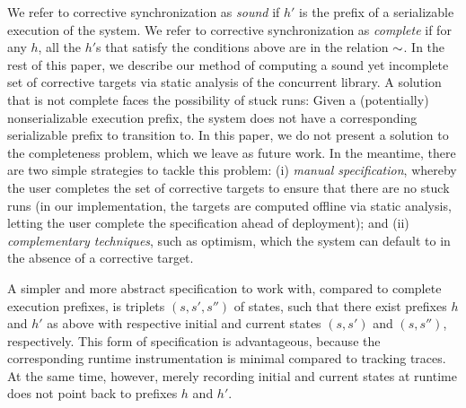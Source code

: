 We refer to corrective synchronization as \emph{sound} if $h'$ is the prefix of a serializable execution of the system. We refer to corrective synchronization as \emph{complete} if for any $h$, all the $h'$s that satisfy the conditions above are in the relation $\sim$. In the rest of this paper, we describe our method of computing a sound yet incomplete set of corrective targets via static analysis of the concurrent library.
%
A solution that is not complete faces the possibility of stuck runs: Given a (potentially) nonserializable execution prefix, the system does not have a corresponding serializable prefix to transition to. In this paper, we do not present a solution to the completeness problem, which we leave as future work. In the meantime, there are two simple strategies to tackle this problem: (i) \emph{manual specification}, whereby the user completes the set of corrective targets to ensure that there are no stuck runs (in our implementation, the targets are computed offline via static analysis, letting the user complete the specification ahead of deployment); and (ii) \emph{complementary techniques}, such as optimism, which the system can default to in the absence of a corrective target.


%
A simpler and more abstract specification to work with, compared to complete execution prefixes, is triplets $(s,s',s'')$ of states, such that there exist prefixes $h$ and $h'$ as above with respective initial and current states $(s,s')$ and $(s,s'')$, respectively. This form of specification is advantageous, because the corresponding runtime instrumentation is minimal compared to tracking traces. At the same time, however, merely recording initial and current states at runtime does not point back to prefixes $h$ and $h'$.


